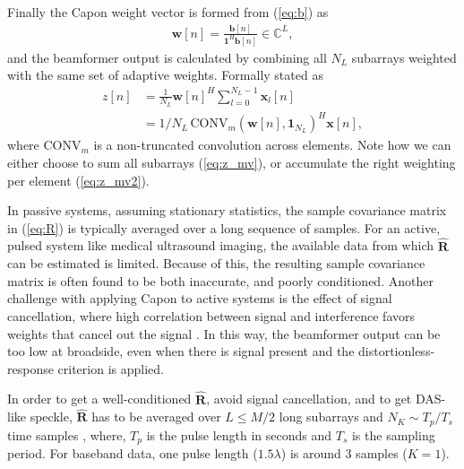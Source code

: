 \documentclass[12pt,journal,onecolumn]{IEEEtran}
\newcommand{\mat}[1]{\mathbf{#1}}
\renewcommand{\vec}[1]{\mathbf{#1}}
\begin{document}
Finally the Capon weight vector is formed from (\ref{eq:b}) as
\begin{align}\label{eq:w}
\vec{w}[n] = \frac{\vec{b}[n]}{\vec{1}^H\vec{b}[n]} \in \mathbb{C}^L,
\end{align}
and the beamformer output is calculated by combining all $N_L$ subarrays weighted with the same set of adaptive weights. Formally stated as
\begin{align}
z[n] &= \frac{1}{N_L}\vec{w}[n]^H \sum_{l=0}^{N_L-1} \vec{x}_l[n] \label{eq:z_mv}\\
&= 1/N_L \, \text{CONV}_m(\vec{w}[n], \vec{1}_{N_L})^H\vec{x}[n] \label{eq:z_mv2},
\end{align}
where $\text{CONV}_m$ is a non-truncated convolution across elements.
Note how we can either choose to sum all subarrays (\ref{eq:z_mv}), or accumulate the right weighting per element (\ref{eq:z_mv2}).

In passive systems, assuming stationary statistics, the sample covariance matrix in (\ref{eq:R}) is typically averaged over a long sequence of samples\cite{Krima}. For an active, pulsed system like medical ultrasound imaging, the available data from which $\mat{\hat{R}}$ can be estimated is limited. Because of this, the resulting sample covariance matrix is often found to be both inaccurate, and poorly conditioned. Another challenge with applying Capon to active systems is the effect of signal cancellation, where high correlation between signal and interference favors weights that cancel out the signal \cite{Reddy1987}. In this way, the beamformer output can be too low at broadside, even when there is signal present and the distortionless-response criterion is applied. 

In order to get a well-conditioned $\mat{\hat{R}}$, avoid signal cancellation, and to get DAS-like speckle, $\mat{\hat{R}}$ has to be averaged over $L\le M/2$ long subarrays and $N_K \sim T_p/T_s$ time samples \cite{Synnevag2007, Synnevag2007a}, where, $T_p$ is the pulse length in seconds and $T_s$ is the sampling period. For baseband data, one pulse length ($1.5\lambda$) is around 3 samples ($K=1$).
\end{document}
